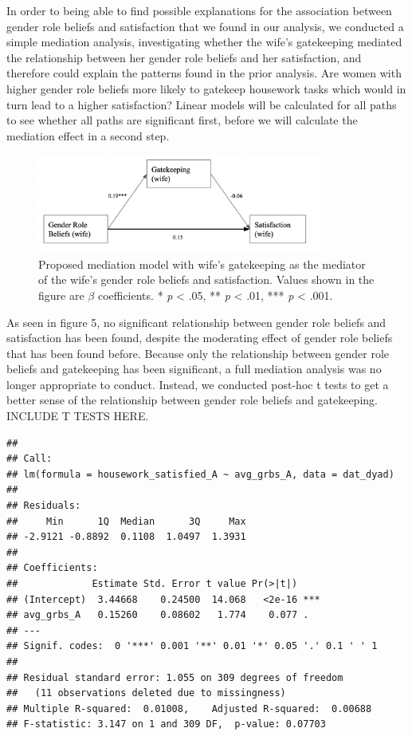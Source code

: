 \documentclass[
  man,floatsintext]{apa6}
\begin{document}
In order to being able to find possible explanations for the association between gender role beliefs and satisfaction that we found in our analysis, we conducted a simple mediation analysis, investigating whether the wife's gatekeeping mediated the relationship between her gender role beliefs and her satisfaction, and therefore could explain the patterns found in the prior analysis. Are women with higher gender role beliefs more likely to gatekeep housework tasks which would in turn lead to a higher satisfaction?
Linear models will be calculated for all paths to see whether all paths are significant first, before we will calculate the mediation effect in a second step.




\begin{figure}
\includegraphics[width=3.69in]{mediation} \caption{Proposed mediation model with wife's gatekeeping as the mediator of the wife's gender role beliefs and satisfaction. Values shown in the figure are \(\beta\) coefficients.
* \emph{p} \textless{} .05, ** \emph{p} \textless{} .01, *** \emph{p} \textless{} .001.}\label{fig:unnamed-chunk-63}
\end{figure}

As seen in figure 5, no significant relationship between gender role beliefs and satisfaction has been found, despite the moderating effect of gender role beliefs that has been found before. Because only the relationship between gender role beliefs and gatekeeping has been significant, a full mediation analysis was no longer appropriate to conduct.
Instead, we conducted post-hoc t tests to get a better sense of the relationship between gender role beliefs and gatekeeping. INCLUDE T TESTS HERE.

\begin{verbatim}
## 
## Call:
## lm(formula = housework_satisfied_A ~ avg_grbs_A, data = dat_dyad)
## 
## Residuals:
##     Min      1Q  Median      3Q     Max 
## -2.9121 -0.8892  0.1108  1.0497  1.3931 
## 
## Coefficients:
##             Estimate Std. Error t value Pr(>|t|)    
## (Intercept)  3.44668    0.24500  14.068   <2e-16 ***
## avg_grbs_A   0.15260    0.08602   1.774    0.077 .  
## ---
## Signif. codes:  0 '***' 0.001 '**' 0.01 '*' 0.05 '.' 0.1 ' ' 1
## 
## Residual standard error: 1.055 on 309 degrees of freedom
##   (11 observations deleted due to missingness)
## Multiple R-squared:  0.01008,    Adjusted R-squared:  0.00688 
## F-statistic: 3.147 on 1 and 309 DF,  p-value: 0.07703
\end{verbatim}
\end{document}
